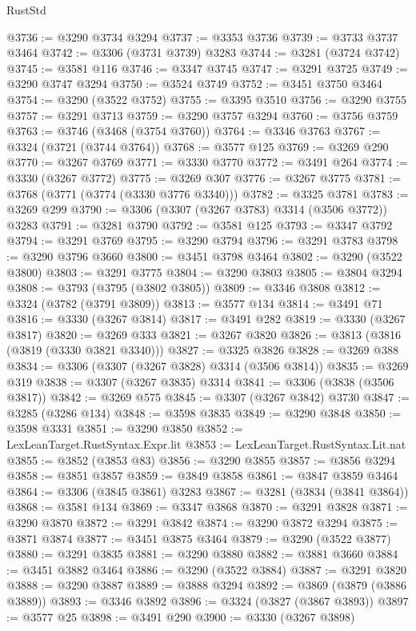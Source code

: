 \begin{lexlean}{RustStd}
\begin{coremodule}
@3736 := @3290 @3734 @3294
@3737 := @3353 @3736
@3739 := @3733 @3737 @3464
@3742 := @3306 (@3731 @3739) @3283
@3744 := @3281 (@3724 @3742)
@3745 := @3581 @116
@3746 := @3347 @3745
@3747 := @3291 @3725
@3749 := @3290 @3747 @3294
@3750 := @3524 @3749
@3752 := @3451 @3750 @3464
@3754 := @3290 (@3522 @3752)
@3755 := @3395 @3510
@3756 := @3290 @3755
@3757 := @3291 @3713
@3759 := @3290 @3757 @3294
@3760 := @3756 @3759
@3763 := @3746 (@3468 (@3754 @3760))
@3764 := @3346 @3763
@3767 := @3324 (@3721 (@3744 @3764))
@3768 := @3577 @125
@3769 := @3269 @290
@3770 := @3267 @3769
@3771 := @3330 @3770
@3772 := @3491 @264
@3774 := @3330 (@3267 @3772)
@3775 := @3269 @307
@3776 := @3267 @3775
@3781 := @3768 (@3771 (@3774 (@3330 @3776 @3340)))
@3782 := @3325 @3781
@3783 := @3269 @299
@3790 := @3306 (@3307 (@3267 @3783) @3314 (@3506 @3772)) @3283
@3791 := @3281 @3790
@3792 := @3581 @125
@3793 := @3347 @3792
@3794 := @3291 @3769
@3795 := @3290 @3794
@3796 := @3291 @3783
@3798 := @3290 @3796 @3660
@3800 := @3451 @3798 @3464
@3802 := @3290 (@3522 @3800)
@3803 := @3291 @3775
@3804 := @3290 @3803
@3805 := @3804 @3294
@3808 := @3793 (@3795 (@3802 @3805))
@3809 := @3346 @3808
@3812 := @3324 (@3782 (@3791 @3809))
@3813 := @3577 @134
@3814 := @3491 @71
@3816 := @3330 (@3267 @3814)
@3817 := @3491 @282
@3819 := @3330 (@3267 @3817)
@3820 := @3269 @333
@3821 := @3267 @3820
@3826 := @3813 (@3816 (@3819 (@3330 @3821 @3340)))
@3827 := @3325 @3826
@3828 := @3269 @388
@3834 := @3306 (@3307 (@3267 @3828) @3314 (@3506 @3814))
@3835 := @3269 @319
@3838 := @3307 (@3267 @3835) @3314
@3841 := @3306 (@3838 (@3506 @3817))
@3842 := @3269 @575
@3845 := @3307 (@3267 @3842) @3730
@3847 := @3285 (@3286 @134)
@3848 := @3598 @3835
@3849 := @3290 @3848
@3850 := @3598 @3331
@3851 := @3290 @3850
@3852 := LexLeanTarget.RustSyntax.Expr.lit
@3853 := LexLeanTarget.RustSyntax.Lit.nat
@3855 := @3852 (@3853 @83)
@3856 := @3290 @3855
@3857 := @3856 @3294
@3858 := @3851 @3857
@3859 := @3849 @3858
@3861 := @3847 @3859 @3464
@3864 := @3306 (@3845 @3861) @3283
@3867 := @3281 (@3834 (@3841 @3864))
@3868 := @3581 @134
@3869 := @3347 @3868
@3870 := @3291 @3828
@3871 := @3290 @3870
@3872 := @3291 @3842
@3874 := @3290 @3872 @3294
@3875 := @3871 @3874
@3877 := @3451 @3875 @3464
@3879 := @3290 (@3522 @3877)
@3880 := @3291 @3835
@3881 := @3290 @3880
@3882 := @3881 @3660
@3884 := @3451 @3882 @3464
@3886 := @3290 (@3522 @3884)
@3887 := @3291 @3820
@3888 := @3290 @3887
@3889 := @3888 @3294
@3892 := @3869 (@3879 (@3886 @3889))
@3893 := @3346 @3892
@3896 := @3324 (@3827 (@3867 @3893))
@3897 := @3577 @25
@3898 := @3491 @290
@3900 := @3330 (@3267 @3898)

\end{coremodule}
\end{lexlean}
